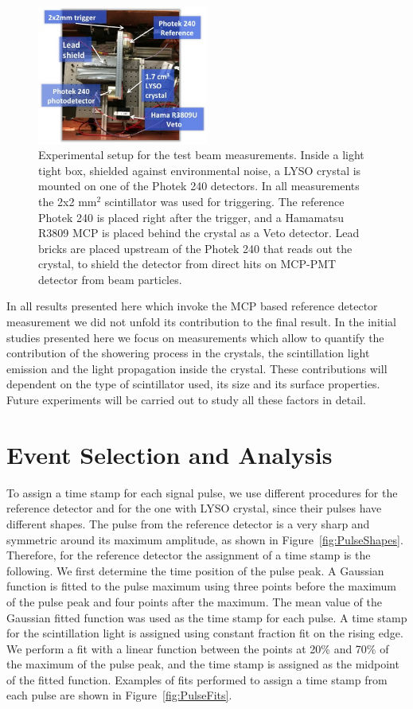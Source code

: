 \documentclass[12pt]{article}
\begin{document}
\begin{figure}[h] \centering
\includegraphics[width=0.5\textwidth]{figs/SetupLYSO} 
\caption{Experimental
setup for the test beam measurements. Inside a light tight box, shielded against
environmental noise, a LYSO crystal is mounted on one of the Photek 240
detectors. In all measurements the 2x2 mm$^2$ scintillator was used for
triggering. The reference Photek 240 is placed right after the trigger, and a
Hamamatsu R3809 MCP is placed behind the crystal as a Veto detector. Lead bricks
are placed upstream of the Photek 240 that reads out the crystal, to shield the detector from 
direct hits on MCP-PMT detector from beam particles.} 
\label{fig:SetupLYSO}
\end{figure}


In all results presented here which invoke the MCP based reference detector
measurement we did not unfold its contribution to the final result. In the
initial studies presented here we focus on measurements which allow to quantify
the contribution of the showering process in the crystals, the scintillation
light emission and the light propagation inside the crystal. These contributions
will dependent on the type of scintillator used, its size and its surface
properties. Future experiments will be carried out to study all these factors in
detail.

\section{Event Selection and Analysis}
To assign a time stamp for each signal
pulse, we use different procedures for the reference detector and for the one
with LYSO crystal, since their pulses have different shapes. The pulse from the
reference detector is a very sharp and symmetric around its maximum amplitude,
as shown in Figure~\ref{fig:PulseShapes}. Therefore, for the reference detector
the assignment of a time stamp is the following. We first determine the time
position of the pulse peak. A Gaussian function is fitted to the pulse maximum
using three points before the maximum of the pulse peak and four points after
the maximum. The mean value of the Gaussian fitted function was used as the time
stamp for each pulse. A time stamp for the scintillation light is assigned using
constant fraction fit on the rising edge. We perform a fit with a linear
function between the points at 20\% and 70\% of the maximum of the pulse peak,
and the time stamp is assigned as the midpoint of the fitted function. Examples of fits performed to assign a time stamp from each pulse are shown in Figure~\ref{fig:PulseFits}.
\end{document}

